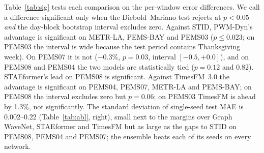 Table~\ref{tab:sig} tests each comparison on the per-window error differences. We call a difference significant only
when the Diebold--Mariano test rejects at $p<0.05$ \emph{and} the day-block bootstrap interval excludes zero. Against
STID, PWM-Dyn's advantage is significant on METR-LA, PEMS-BAY and PEMS03 ($p\le0.023$; on PEMS03 the interval is
wide because the test period contains Thanksgiving week). On PEMS07 it is not ($-0.3\%$, $p=0.03$, interval
$[-0.5,+0.0]$), and on PEMS08 and PEMS04 the two models are statistically tied ($p=0.12$ and $0.82$). STAEformer's lead
on PEMS08 is significant. Against TimesFM~3.0 the advantage is significant on PEMS04, PEMS07, METR-LA and PEMS-BAY; on
PEMS08 the interval excludes zero but $p=0.06$; on PEMS03 TimesFM is ahead by 1.3\%, not significantly. The standard
deviation of single-seed test MAE is 0.002--0.22 (Table~\ref{tab:abl}, right), small next to the margins over Graph
WaveNet, STAEformer and TimesFM but as large as the gaps to STID on PEMS08, PEMS04 and PEMS07; the ensemble beats each
of its seeds on every network.
